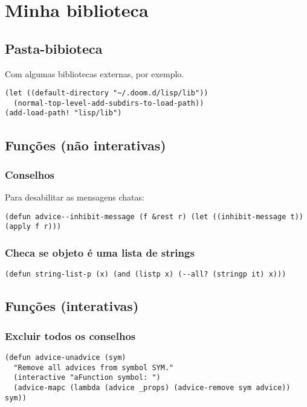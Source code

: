 \documentclass[11pt]{article}
\begin{document}
\section{Minha biblioteca}
\label{sec:orgdf5fc86}
\subsection{Pasta-bibioteca}
\label{sec:org96002e9}

Com algumas bibliotecas externas, por exemplo.

\begin{verbatim}
(let ((default-directory "~/.doom.d/lisp/lib"))
  (normal-top-level-add-subdirs-to-load-path))
(add-load-path! "lisp/lib")
\end{verbatim}

\subsection{Funções (não interativas)}
\label{sec:orgae01f86}
\subsubsection{Conselhos}
\label{sec:orgb1a8bfa}
Para desabilitar as mensagens chatas:
\begin{verbatim}
(defun advice--inhibit-message (f &rest r) (let ((inhibit-message t)) (apply f r)))
\end{verbatim}

\subsubsection{Checa se objeto é uma lista de strings}
\label{sec:orga2e5768}
\begin{verbatim}
(defun string-list-p (x) (and (listp x) (--all? (stringp it) x)))
\end{verbatim}

\subsection{Funções (interativas)}
\label{sec:org6418272}
\subsubsection{Excluir todos os conselhos}
\label{sec:orgd53a425}
\begin{verbatim}
(defun advice-unadvice (sym)
  "Remove all advices from symbol SYM."
  (interactive "aFunction symbol: ")
  (advice-mapc (lambda (advice _props) (advice-remove sym advice)) sym))
\end{verbatim}
\end{document}
